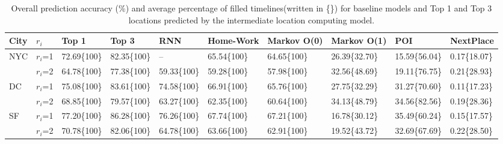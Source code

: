\begin{table*}[t]
\small
\centering
\begin{tabular}{llllllllll}
\toprule
City           & $r_i$   & Top 1 & Top 3 & RNN &  Home-Work & Markov O(0) & Markov O(1) & POI   & NextPlace \\
\midrule
NYC  & $r_i$=1 & 72.69\{100\} & 82.35\{100\} &  -- &   65.54\{100\}     & 64.65\{100\}       & 26.39\{32.70\}       & 15.59\{56.04\} & 0.17\{18.07\}      \\
               & $r_i$=2 & 64.78\{100\} & 77.38\{100\} & 59.33\{100\} & 59.28\{100\}     & 57.98\{100\}       & 32.56\{48.69\}       & 19.11\{76.75\} & 0.21\{28.93\}      \\
DC & $r_i$=1 & 75.08\{100\} & 83.61\{100\} & 74.58\{100\} & 66.91\{100\}     & 65.76\{100\}       & 27.75\{32.29\}       & 31.27\{70.60\} & 0.11\{17.23\}      \\
               & $r_i$=2 & 68.85\{100\} & 79.57\{100\} &63.27\{100\}& 62.35\{100\}     & 60.64\{100\}       & 34.13\{48.79\}       & 34.56\{82.56\} & 0.19\{28.36\}      \\
SF  & $r_i$=1 & 77.20\{100\} & 86.28\{100\} &76.26\{100\}& 67.74\{100\}     & 67.21\{100\}       & 16.78\{30.12\}       & 35.49\{60.24\} & 0.15\{17.57\}      \\
               & $r_i$=2 & 70.78\{100\} & 82.06\{100\} &64.78\{100\}& 63.66\{100\}     & 62.91\{100\}       & 19.52\{43.72\}       & 32.69\{67.69\} & 0.22\{28.50\}\\ 
\bottomrule               
\end{tabular}
\caption{Overall prediction accuracy (\%) and average percentage of filled timelines(written in \{\}) for baseline models and Top 1 and Top 3 locations predicted by the intermediate location computing model.}
\end{table*}